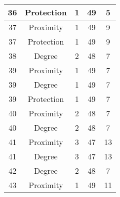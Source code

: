 \documentclass[results.tex]{subfiles}
\begin{document}
\begin{center}
\begin{tabular}{| c || c | c | c | c |}
            \hline
            36                      & Protection                   & 1                      & 49                      & 5                    \\
            \hline
            37                      & Proximity                    & 1                      & 49                      & 9                    \\
            \hline
            37                      & Protection                   & 1                      & 49                      & 9                    \\
            \hline
            38                      & Degree                       & 2                      & 48                      & 7                    \\
            \hline
            39                      & Proximity                    & 1                      & 49                      & 7                    \\
            \hline
            39                      & Degree                       & 1                      & 49                      & 7                    \\
            \hline
            39                      & Protection                   & 1                      & 49                      & 7                    \\
            \hline
            40                      & Proximity                    & 2                      & 48                      & 7                    \\
            \hline
            40                      & Degree                       & 2                      & 48                      & 7                    \\
            \hline
            41                      & Proximity                    & 3                      & 47                      & 13                   \\
            \hline
            41                      & Degree                       & 3                      & 47                      & 13                   \\
            \hline
            42                      & Degree                       & 2                      & 48                      & 7                    \\
            \hline
            43                      & Proximity                    & 1                      & 49                      & 11                   \\

\end{tabular}
\end{center}
\end{document}
